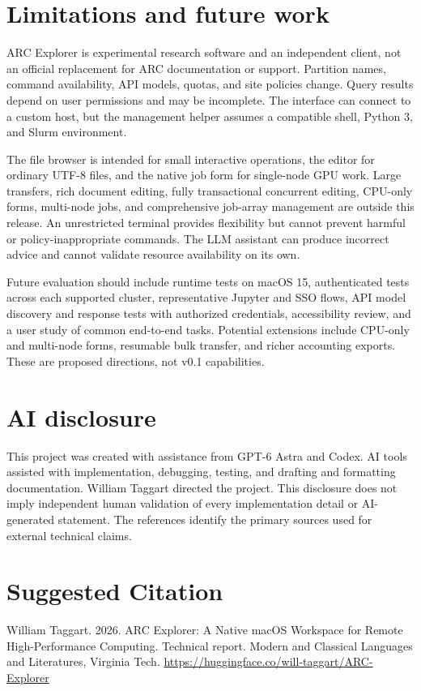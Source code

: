 \documentclass[manuscript,screen,nonacm]{acmart}
\begin{document}
\section{Limitations and future work}

ARC Explorer is experimental research software and an independent client, not an official replacement for ARC documentation or support. Partition names, command availability, API models, quotas, and site policies change. Query results depend on user permissions and may be incomplete. The interface can connect to a custom host, but the management helper assumes a compatible shell, Python 3, and Slurm environment.

The file browser is intended for small interactive operations, the editor for ordinary UTF-8 files, and the native job form for single-node GPU work. Large transfers, rich document editing, fully transactional concurrent editing, CPU-only forms, multi-node jobs, and comprehensive job-array management are outside this release. An unrestricted terminal provides flexibility but cannot prevent harmful or policy-inappropriate commands. The LLM assistant can produce incorrect advice and cannot validate resource availability on its own.

Future evaluation should include runtime tests on macOS 15, authenticated tests across each supported cluster, representative Jupyter and SSO flows, API model discovery and response tests with authorized credentials, accessibility review, and a user study of common end-to-end tasks. Potential extensions include CPU-only and multi-node forms, resumable bulk transfer, and richer accounting exports. These are proposed directions, not v0.1 capabilities.

\section{AI disclosure}

This project was created with assistance from GPT-6 Astra and Codex. AI tools assisted with implementation, debugging, testing, and drafting and formatting documentation. William Taggart directed the project. This disclosure does not imply independent human validation of every implementation detail or AI-generated statement. The references identify the primary sources used for external technical claims.

\enlargethispage{2\baselineskip}


\section*{Suggested Citation}
William Taggart. 2026. ARC Explorer: A Native macOS Workspace for Remote High-Performance Computing. Technical report. Modern and Classical Languages and Literatures, Virginia Tech.
\url{https://huggingface.co/will-taggart/ARC-Explorer}
\end{document}
